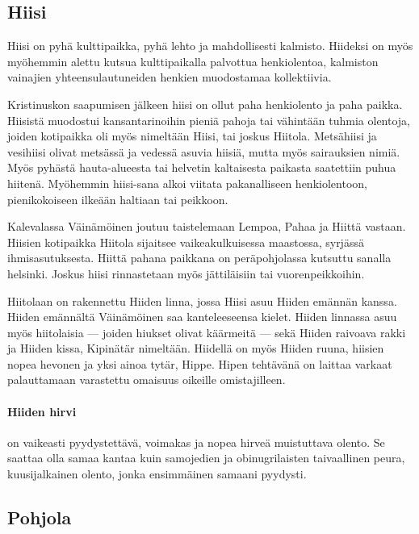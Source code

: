 \subsection{Hiisi}

  Hiisi on pyhä kulttipaikka, pyhä lehto ja mahdollisesti kalmisto. Hiideksi on myös myöhemmin
  alettu kutsua kulttipaikalla palvottua henkiolentoa, kalmiston vainajien yhteensulautuneiden
  henkien muodostamaa kollektiivia.
  \par
  Kristinuskon saapumisen jälkeen hiisi on ollut paha henkiolento ja paha paikka. Hiisistä
  muodostui kansantarinoihin pieniä pahoja tai vähintään tuhmia olentoja, joiden kotipaikka oli
  myös nimeltään Hiisi, tai joskus Hiitola. Metsähiisi ja vesihiisi olivat metsässä ja vedessä
  asuvia hiisiä, mutta myös sairauksien nimiä. Myös pyhästä hauta-alueesta tai helvetin kaltaisesta
  paikasta saatettiin puhua hiitenä. Myöhemmin hiisi-sana alkoi viitata pakanalliseen
  henkiolentoon, pienikokoiseen ilkeään haltiaan tai peikkoon.
  \par
  Kalevalassa Väinämöinen joutuu taistelemaan Lempoa, Pahaa ja Hiittä vastaan. Hiisien kotipaikka
  Hiitola sijaitsee vaikeakulkuisessa maastossa, syrjässä ihmisasutuksesta. Hiittä pahana paikkana
  on peräpohjolassa kutsuttu sanalla helsinki. Joskus hiisi rinnastetaan myös jättiläisiin tai
  vuorenpeikkoihin.
  \par
  Hiitolaan on rakennettu Hiiden linna, jossa Hiisi asuu Hiiden emännän kanssa. Hiiden emännältä
  Väinämöinen saa kanteleeseensa kielet. Hiiden linnassa asuu myös hiitolaisia --- joiden hiukset
  olivat käärmeitä --- sekä Hiiden raivoava rakki ja Hiiden kissa, Kipinätär nimeltään. Hiidellä
  on myös Hiiden ruuna, hiisien nopea hevonen ja yksi ainoa tytär, Hippe. Hipen tehtävänä on
  laittaa varkaat palauttamaan varastettu omaisuus oikeille omistajilleen. 

  \paragraph{Hiiden hirvi} on vaikeasti pyydystettävä, voimakas ja nopea hirveä muistuttava olento.
    Se saattaa olla samaa kantaa kuin samojedien ja obinugrilaisten taivaallinen peura,
    kuusijalkainen olento, jonka ensimmäinen samaani pyydysti. 


\subsection{Pohjola}

